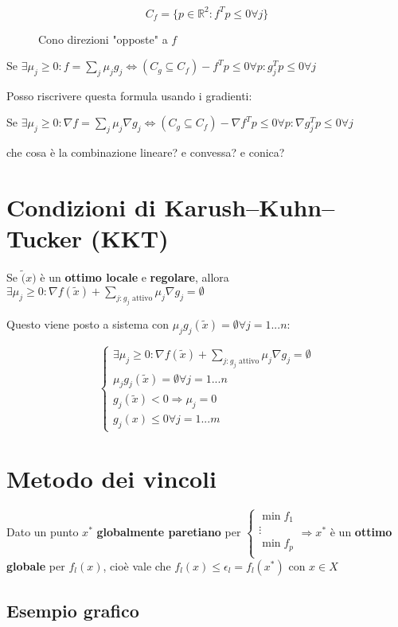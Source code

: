 \documentclass[\main/main.tex]{subfiles}
\begin{document}
\begin{figure}[H]
	\[
		C_f = \{ p \in \mathbb{R}^2: f^T p \leq 0 \forall j \}
	\]
	\caption{Cono direzioni "opposte" a $f$}
\end{figure}

Se $\exists \mu_j \geq 0 : f = \sum_j \mu_j g_j \Leftrightarrow (C_g \subseteq C_f) -f^Tp \leq 0 \forall p: g_j^Tp \leq 0 \forall j$

Posso riscrivere questa formula usando i gradienti:

Se $\exists \mu_j \geq 0 : \nabla f = \sum_j \mu_j \nabla g_j \Leftrightarrow (C_g \subseteq C_f) -\nabla f^Tp \leq 0 \forall p: \nabla g_j^Tp \leq 0 \forall j$

che cosa è la combinazione lineare? e convessa? e conica?

\section{Condizioni di Karush–Kuhn–Tucker (KKT)}

Se $\widetilde(x)$ è un \textbf{ottimo locale} e \textbf{regolare}, allora $\exists \mu_j \geq 0: \nabla f(\widetilde{x}) + \sum_{j:g_j \text{ attivo}} \mu_j \nabla g_j = \emptyset$

Questo viene posto a sistema con $\mu_j g_j (\widetilde{x}) = \emptyset \forall j = 1...n$:

\[
	\begin{cases}
		\exists \mu_j \geq 0: \nabla f(\widetilde{x}) + \sum_{j:g_j \text{ attivo}} \mu_j \nabla g_j = \emptyset \\
		\mu_j g_j (\widetilde{x}) = \emptyset \forall j = 1...n                                                  \\
		g_j(\widetilde{x}) <0 \Rightarrow \mu_j =0                                                               \\
		g_j(x) \leq 0 \forall j = 1...m
	\end{cases}
\]

\section{Metodo dei vincoli}
Dato un punto $x^*$ \textbf{globalmente paretiano} per $\begin{cases}
		\min f_1 \\
		\vdots   \\
		\min f_p \\
	\end{cases} \Rightarrow x^*$ è un \textbf{ottimo globale} per $f_l(x)$, cioè vale che $f_l(x) \leq \epsilon_l = f_l(x^*)$ con $x \in X$

\subsection{Esempio grafico}
\end{document}
